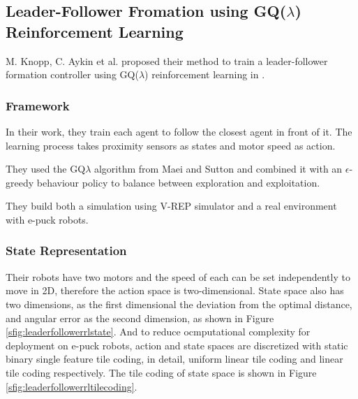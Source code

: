 \subsection{Leader-Follower Fromation using GQ($\lambda$) Reinforcement Learning}

M. Knopp, C. Aykin et al. proposed their method to train a leader-follower formation controller using GQ($\lambda$) reinforcement learning in \cite{knopp2017formation}.

\subsubsection{Framework}

In their work, they train each agent to follow the closest agent in front of it. 
The learning process takes proximity sensors as states and motor speed as action.

They used the GQ$\lambda$ algorithm from Maei and Sutton \cite{maei2010gq} and combined it with an $\epsilon$-greedy behaviour policy to balance between exploration and exploitation.

They build both a simulation using V-REP simulator and a real environment with e-puck robots.

\subsubsection{State Representation}

Their robots have two motors and the speed of each can be set independently to move in 2D, therefore the action space is two-dimensional.
State space also has two dimensions, as the first dimensional the deviation from the optimal distance, and angular error as the second dimension, as shown in Figure \ref{sfig:leaderfollowerrlstate}.
And to reduce ocmputational complexity for deployment on e-puck robots, action and state spaces are discretized with static binary single feature tile coding, in detail, uniform linear tile coding and linear tile coding respectively. 
The tile coding of state space is shown in Figure \ref{sfig:leaderfollowerrltilecoding}.

